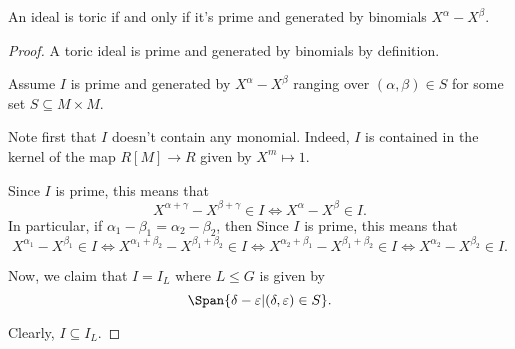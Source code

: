 \begin{proposition}
  \label{1-1-11-toric-ideal-gen-binomial}

  An ideal is toric if and only if it's prime and generated by binomials $X^\alpha - X^\beta$.
\end{proposition}
\begin{proof}

  A toric ideal is prime and generated by binomials by definition.

  Assume $I$ is prime and generated by $X^\alpha - X^\beta$ ranging over $(\alpha, \beta) \in S$
  for some set $S \subseteq M \times M$.

  Note first that $I$ doesn't contain any monomial.
  Indeed, $I$ is contained in the kernel of the map $R[M] \to R$ given by $X^m \mapsto 1$.

  Since $I$ is prime, this means that
  \[
    X^{\alpha + \gamma} - X^{\beta + \gamma} \in I \iff X^\alpha - X^\beta \in I.
  \]
  In particular, if $\alpha_1 - \beta_1 = \alpha_2 - \beta_2$, then
  Since $I$ is prime, this means that
  \[
    X^{\alpha_1} - X^{\beta_1} \in I
      \iff X^{\alpha_1 + \beta_2} - X^{\beta_1 + \beta_2} \in I
      \iff X^{\alpha_2 + \beta_1} - X^{\beta_1 + \beta_2} \in I
      \iff X^{\alpha_2} - X^{\beta_2} \in I.
  \]

  Now, we claim that $I = I_L$ where $L \le G$ is given by
  \[
    \Span\{\delta - \varepsilon | (\delta, \varepsilon) \in S\}.
  \]

  Clearly, $I \subseteq I_L$.


\end{proof}
